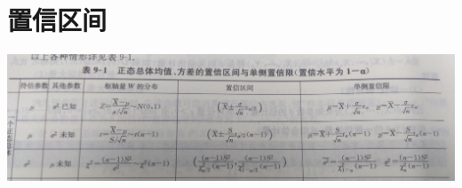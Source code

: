 \documentclass[UTF8]{ctexart}
\begin{document}
\section{置信区间}
\includegraphics[width=14cm]{9345E7/IMG_20180718_173505.jpg}
\end{document}
